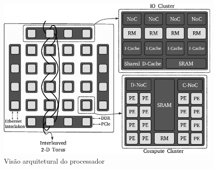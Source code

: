 \begin{figure}[bt]
    \centering
    \includegraphics[width=0.9\linewidth]{content/images/arch-mppa-gs.png}
    \caption{Visão arquitetural do processador \mppa \cite{penna:sbesc19}}\label{fig.arch-mppa}
\end{figure}

\section{\nanvixos}\label{sec.nanvixos}

